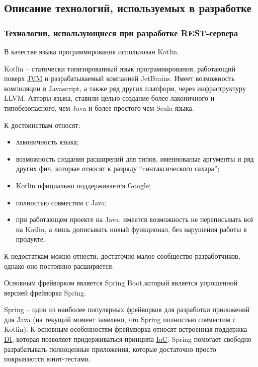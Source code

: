 \subsection{Описание технологий, используемых в разработке}\label{subsec:2-tech-review}\indent


\subsubsection{Технологии, использующиеся при разработке REST-сервера}\indent

В качестве языка программирования использован Kotlin.

Kotlin – статически типизированный язык програмиирования, работающий поверх \hyperlink{gloss:jvm}{JVM} и разрабатываемый компанией JetBrains. Имеет возможность компиляции в Javascript, а также ряд других платформ, через инфраструктуру LLVM. Авторы языка, ставили целью создание более лаконичного и типобезопасного, чем Java и более простого чем Scala языка.\cite{kotlin}

К достоинствам относят:
\begin{itemize}
    \item лаконичность языка;
    \item возможность создания расширений для типов, именнованые аргументы и ряд других фич, которые относят к разряду “cинтаксического сахара”;
    \item Kotlin официально поддерживается Google;
    \item полностью совместим с Java;
    \item при работающем проекте на Java, имеется возможность не переписывать всё на Kotlin, а лишь дописывать новый функционал, без нарушения работы в продукте.
\end{itemize}

К недостаткам можно отнести, достаточно малое сообщество разработчиков, однако оно постоянно расширяется.

Основным фрейворком является Spring Boot,который является упрощенной версией фрейворка Spring.

Spring – один из наиболее популярных фрейворков для разработки приложений для Java (на текущий момент заявлено, что Spring полностью совместим с Kotlin).
К основным особенностям фреймворка относят встроенная поддержка \hyperlink{gloss:di}{DI}, которая позволяет придерживаться принципа \hyperlink{gloss:ioc}{IoC}.
Spring помогает свободно разрабатывать полноценные приложения, которые достаточно просто покрываются юнит-тестами.

